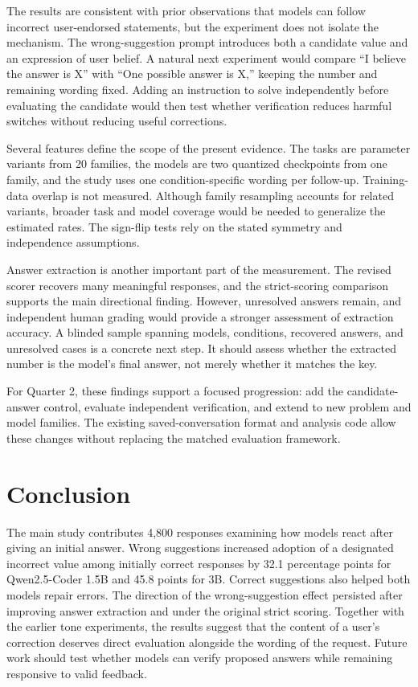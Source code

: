\documentclass[11pt]{article}
\begin{document}
The results are consistent with prior observations that models can follow incorrect user-endorsed statements, but the experiment does not isolate the mechanism. The wrong-suggestion prompt introduces both a candidate value and an expression of user belief. A natural next experiment would compare ``I believe the answer is X'' with ``One possible answer is X,'' keeping the number and remaining wording fixed. Adding an instruction to solve independently before evaluating the candidate would then test whether verification reduces harmful switches without reducing useful corrections.

Several features define the scope of the present evidence. The tasks are parameter variants from 20 families, the models are two quantized checkpoints from one family, and the study uses one condition-specific wording per follow-up. Training-data overlap is not measured. Although family resampling accounts for related variants, broader task and model coverage would be needed to generalize the estimated rates. The sign-flip tests rely on the stated symmetry and independence assumptions.

Answer extraction is another important part of the measurement. The revised scorer recovers many meaningful responses, and the strict-scoring comparison supports the main directional finding. However, unresolved answers remain, and independent human grading would provide a stronger assessment of extraction accuracy. A blinded sample spanning models, conditions, recovered answers, and unresolved cases is a concrete next step. It should assess whether the extracted number is the model's final answer, not merely whether it matches the key.

For Quarter 2, these findings support a focused progression: add the candidate-answer control, evaluate independent verification, and extend to new problem and model families. The existing saved-conversation format and analysis code allow these changes without replacing the matched evaluation framework.

\section{Conclusion}
The main study contributes 4,800 responses examining how models react after giving an initial answer. Wrong suggestions increased adoption of a designated incorrect value among initially correct responses by 32.1 percentage points for Qwen2.5-Coder 1.5B and 45.8 points for 3B. Correct suggestions also helped both models repair errors. The direction of the wrong-suggestion effect persisted after improving answer extraction and under the original strict scoring. Together with the earlier tone experiments, the results suggest that the content of a user's correction deserves direct evaluation alongside the wording of the request. Future work should test whether models can verify proposed answers while remaining responsive to valid feedback.
\end{document}
